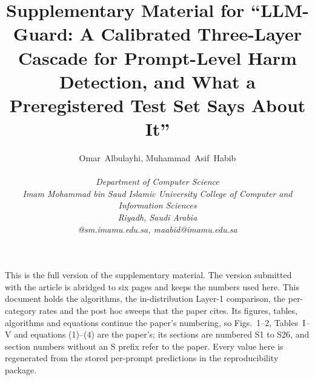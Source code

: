 \documentclass[journal]{IEEEtran}
\begin{document}
\title{Supplementary Material for ``LLM-Guard: A Calibrated Three-Layer Cascade for Prompt-Level Harm Detection, and What a Preregistered Test Set Says About It''}
\author{Omar~Albulayhi, Muhammad~Asif~Habib\\[2pt]
\parbox{\textwidth}{\centering\footnotesize \itshape Department of Computer Science\\
\itshape Imam Mohammad bin Saud Islamic University College of Computer and Information Sciences\\
\upshape Riyadh, Saudi Arabia\\
@sm.imamu.edu.sa, maabid@imamu.edu.sa}}
\maketitle

This is the full version of the supplementary material. The version submitted with the article is abridged to six pages and keeps the numbers used here. This document holds the algorithms, the in-distribution Layer-1 comparison, the per-category rates and the post hoc sweeps that the paper cites. Its figures, tables, algorithms and equations continue the paper's numbering, so Figs.~1--2, Tables~I--V and equations (1)--(4) are the paper's; its sections are numbered S1 to S26, and section numbers without an S prefix refer to the paper. Every value here is regenerated from the stored per-prompt predictions in the reproducibility package.
\end{document}
